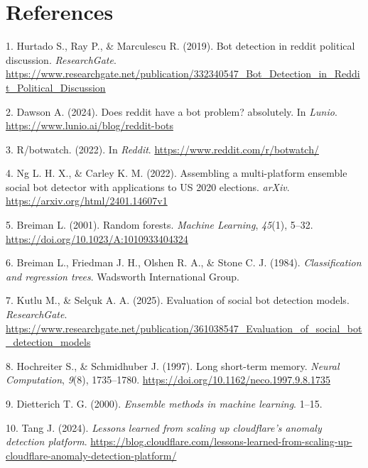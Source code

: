 \documentclass[
  12pt,
  letterpaper,
  DIV=11,
  numbers=noendperiod,
  abstract]{scrartcl}
\newlength{\cslhangindent}
\newenvironment{CSLReferences}[2] %
 {\begin{list}{}{%
  \setlength{\itemindent}{0pt}
  \setlength{\leftmargin}{0pt}
  \setlength{\parsep}{0pt}
  \ifodd #1
   \setlength{\leftmargin}{\cslhangindent}
   \setlength{\itemindent}{-1\cslhangindent}
  \fi
  \setlength{\itemsep}{#2\baselineskip}}}
 {\end{list}}
\begin{document}
\newpage

\section*{References}\label{references}

\label{refs}
\begin{CSLReferences}{1}{0}
1. Hurtado S., Ray P., \& Marculescu R. (2019). Bot detection in reddit
political discussion. \emph{ResearchGate}.
\url{https://www.researchgate.net/publication/332340547_Bot_Detection_in_Reddit_Political_Discussion}

2. Dawson A. (2024). Does reddit have a bot problem? absolutely. In
\emph{Lunio}. \url{https://www.lunio.ai/blog/reddit-bots}

3. R/botwatch. (2022). In \emph{Reddit}.
\url{https://www.reddit.com/r/botwatch/}

4. Ng L. H. X., \& Carley K. M. (2022). Assembling a multi-platform
ensemble social bot detector with applications to US 2020 elections.
\emph{arXiv}. \url{https://arxiv.org/html/2401.14607v1}

5. Breiman L. (2001). Random forests. \emph{Machine Learning},
\emph{45}(1), 5--32. \url{https://doi.org/10.1023/A:1010933404324}

6. Breiman L., Friedman J. H., Olshen R. A., \& Stone C. J. (1984).
\emph{Classification and regression trees}. Wadsworth International
Group.

7. Kutlu M., \& Selçuk A. A. (2025). Evaluation of social bot detection
models. \emph{ResearchGate}.
\url{https://www.researchgate.net/publication/361038547_Evaluation_of_social_bot_detection_models}

8. Hochreiter S., \& Schmidhuber J. (1997). Long short-term memory.
\emph{Neural Computation}, \emph{9}(8), 1735--1780.
\url{https://doi.org/10.1162/neco.1997.9.8.1735}

9. Dietterich T. G. (2000). \emph{Ensemble methods in machine learning}.
1--15.

10. Tang J. (2024). \emph{Lessons learned from scaling up cloudflare's
anomaly detection platform}.
\url{https://blog.cloudflare.com/lessons-learned-from-scaling-up-cloudflare-anomaly-detection-platform/}


\end{CSLReferences}
\end{document}

